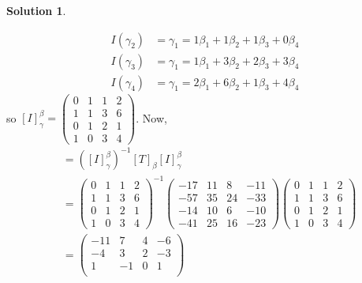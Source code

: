 \documentclass[10pt]{article}
\theoremstyle{definition}
\newtheorem{soln}{Solution}
\begin{document}
\begin{soln}
\begin{enumerate}
\begin{align*}
            I(\gamma_2) & =\gamma_1=1\beta_1+1\beta_2+1\beta_3+0\beta_4 \\
            I(\gamma_3) & =\gamma_1=1\beta_1+3\beta_2+2\beta_3+3\beta_4 \\
            I(\gamma_4) & =\gamma_1=2\beta_1+6\beta_2+1\beta_3+4\beta_4
          \end{align*}
          so $\left[I\right]_\gamma^\beta=\begin{pmatrix}
              0 & 1 & 1 & 2 \\
              1 & 1 & 3 & 6 \\
              0 & 1 & 2 & 1 \\
              1 & 0 & 3 & 4
            \end{pmatrix}$. Now,
          \begin{align*}
             & = \left(\left[I\right]_\gamma^\beta\right)^{-1}\left[T\right]_\beta\left[I\right]_\gamma^\beta \\
             & = \begin{pmatrix}
                   0 & 1 & 1 & 2 \\
                   1 & 1 & 3 & 6 \\
                   0 & 1 & 2 & 1 \\
                   1 & 0 & 3 & 4
                 \end{pmatrix}^{-1}
            \begin{pmatrix}
              -17 & 11 & 8  & -11 \\
              -57 & 35 & 24 & -33 \\
              -14 & 10 & 6  & -10 \\
              -41 & 25 & 16 & -23
            \end{pmatrix}
            \begin{pmatrix}
              0 & 1 & 1 & 2 \\
              1 & 1 & 3 & 6 \\
              0 & 1 & 2 & 1 \\
              1 & 0 & 3 & 4
            \end{pmatrix}                                                                                    \\
             & =
            \begin{pmatrix}
              -11 & 7  & 4  & -6 \\
              -4  & 3  & 2  & -3 \\
              1   & -1 & 0  & 1  \\

\end{pmatrix}
\end{align*}
\end{enumerate}
\end{soln}
\end{document}
